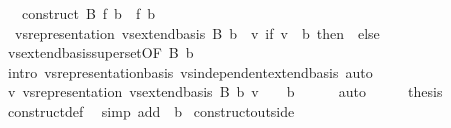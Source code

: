 \begin{isabellebody}
\ \ \ {\isachardoublequoteopen}construct\ B\ f\ b\ {\isacharequal}{\kern0pt}\ f\ b{\isachardoublequoteclose}\isanewline
%
\isadelimproof
%
\endisadelimproof
%
\isatagproof
{}\isamarkupfalse%
\ {\isacharminus}{\kern0pt}\isanewline
\ \ \isamarkupfalse%
\ {\isacharasterisk}{\kern0pt}{\isacharcolon}{\kern0pt}\ {\isachardoublequoteopen}vs{}{\isachardot}{\kern0pt}representation\ {\isacharparenleft}{\kern0pt}vs{}{\isachardot}{\kern0pt}extend{\isacharunderscore}{\kern0pt}basis\ B{\isacharparenright}{\kern0pt}\ b\ {\isacharequal}{\kern0pt}\ {\isacharparenleft}{\kern0pt}{\isasymlambda}v{\isachardot}{\kern0pt}\ if\ v\ {\isacharequal}{\kern0pt}\ b\ then\ {}\ else\ {}{\isacharparenright}{\kern0pt}{\isachardoublequoteclose}\isanewline
\ \ \ \ \isamarkupfalse%
\ vs{}{\isachardot}{\kern0pt}extend{\isacharunderscore}{\kern0pt}basis{\isacharunderscore}{\kern0pt}superset{\isacharbrackleft}{\kern0pt}OF\ B{\isacharbrackright}{\kern0pt}\ b\isanewline
\ \ \ \ \isamarkupfalse%
\ {\isacharparenleft}{\kern0pt}intro\ vs{}{\isachardot}{\kern0pt}representation{\isacharunderscore}{\kern0pt}basis\ vs{}{\isachardot}{\kern0pt}independent{\isacharunderscore}{\kern0pt}extend{\isacharunderscore}{\kern0pt}basis{\isacharparenright}{\kern0pt}\ auto\isanewline
\ \ \isamarkupfalse%
\ \isamarkupfalse%
\ {\isachardoublequoteopen}{\isacharbraceleft}{\kern0pt}v{\isachardot}{\kern0pt}\ vs{}{\isachardot}{\kern0pt}representation\ {\isacharparenleft}{\kern0pt}vs{}{\isachardot}{\kern0pt}extend{\isacharunderscore}{\kern0pt}basis\ B{\isacharparenright}{\kern0pt}\ b\ v\ {\isasymnoteq}\ {}{\isacharbraceright}{\kern0pt}\ {\isacharequal}{\kern0pt}\ {\isacharbraceleft}{\kern0pt}b{\isacharbraceright}{\kern0pt}{\isachardoublequoteclose}\isanewline
\ \ \ \ \isamarkupfalse%
\ auto\isanewline
\ \ \isamarkupfalse%
\ \isamarkupfalse%
\ {\isacharquery}{\kern0pt}thesis\isanewline
\ \ \ \ \isamarkupfalse%
\ construct{\isacharunderscore}{\kern0pt}def\ \isamarkupfalse%
\ {\isacharparenleft}{\kern0pt}simp\ add{\isacharcolon}{\kern0pt}\ {\isacharasterisk}{\kern0pt}\ b{\isacharparenright}{\kern0pt}\isanewline
{}\isamarkupfalse%
%
\endisatagproof
{\isafoldproof}%
%
\isadelimproof
\isanewline
%
\endisadelimproof
\isanewline
{}\isamarkupfalse%
\ construct{\isacharunderscore}{\kern0pt}outside{\isacharcolon}{\kern0pt}\isanewline

\end{isabellebody}
